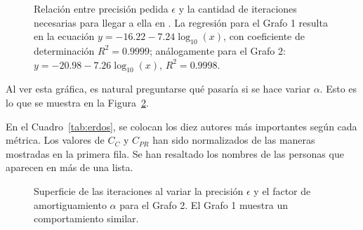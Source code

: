 \documentclass[journal]{IEEEtran}
\let\MYoriglatexcaption\caption
\renewcommand{\caption}[2][\relax]{\MYoriglatexcaption[#2]{#2}}
\begin{document}
\begin{figure}
\centering
{}
\caption{Relación entre precisión pedida \(\epsilon\) y la cantidad de iteraciones necesarias para llegar a ella en \textproc{PageRank}. La regresión para el Grafo 1 resulta en la ecuación $y = -16.22-7.24\log_{10}(x)$, con coeficiente de determinación  $R^2 = 0.9999$; análogamente para el Grafo 2: $y = -20.98-7.26\log_{10}(x)$, $R^2 = 0.9998$.}
\label{fig:itpr}
\end{figure}

Al ver esta gráfica, es natural preguntarse qué pasaría si se hace variar \(\alpha\). Esto es lo que se muestra en la Figura~\ref{fig:3dpr}.

En el Cuadro~\ref{tab:erdos}, se colocan los diez autores más importantes según cada métrica. Los valores de \(C_C\) y \(C_{PR}\) han sido normalizados de las maneras mostradas en la primera fila. Se han resaltado los nombres de las personas que aparecen en más de una lista.

\begin{figure}
\centering
{}
\caption{Superficie de las iteraciones al variar la precisión \(\epsilon\) y el factor de amortiguamiento \(\alpha\) para el Grafo 2. El Grafo 1 muestra un comportamiento similar.}
\label{fig:3dpr}
\end{figure}
\end{document}
